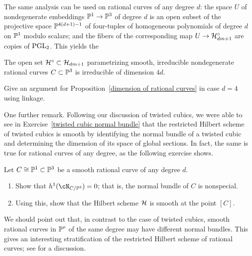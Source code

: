 The same analysis can be used on rational curves of any degree $d$: the space $U$ of nondegenerate embeddings $\PP^1 \to \PP^3$ of degree $d$ is an open subset of the projective space $\PP^{4(d+1)-1}$ of four-tuples of homogeneous polynomials of degree $d$ on $\PP^1$ modulo scalars; and the fibers of the corresponding map $U \to \cH^\circ_{dm+1}$ are copies of $\PGL_2$. This yields the

\begin{proposition}\label{dimension of rational curves}
The open set $\cH^\circ \subset \cH_{dm+1}$ parametrizing smooth, irreducible nondegenerate rational curves $C \subset \PP^3$ is irreducible of dimension $4d$.
\end{proposition}

\begin{exercise}
Give an argument for Proposition~\ref{dimension of rational curves} in case $d=4$ using linkage. 
\end{exercise}

One further remark. Following our discussion of twisted cubics, we were able to see in Exercise~\ref{twisted cubic normal bundle} that the restricted Hilbert scheme of twisted cubics is smooth by identifying the normal bundle of a twisted cubic and determining the dimension of its space of global sections. In fact, the same is true for rational curves of any degree, as the following exercise shows.

\begin{exercise}
Let $C \cong \PP^1 \subset \PP^3$ be a smooth rational curve of any degree $d$. 
\begin{enumerate}
\item Show that $h^1(\cN_{C/\PP^3}) = 0$; that is, the normal bundle of $C$ is nonspecial.
\item Using this, show that the Hilbert scheme $\cH$ is smooth at the point $[C]$.
\end{enumerate} 
\end{exercise}

We should point out that, in contrast to the case of twisted cubics, smooth rational curves in $\PP^r$ of the same degree may have different normal bundles. This gives an interesting stratification of the restricted Hilbert scheme of rational curves; see \cite{Riedl paper?} for a discussion.


